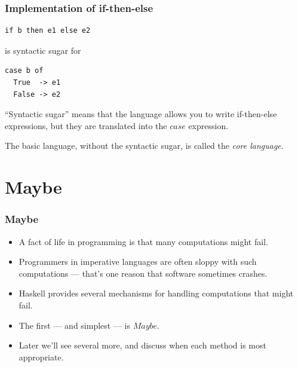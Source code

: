 \documentclass{beamer}
\begin{document}
\begin{frame}[fragile]
\frametitle{Implementation of if-then-else}

\begin{verbatim}
if b then e1 else e2
\end{verbatim}

is syntactic sugar for

\begin{verbatim}
case b of
  True  -> e1
  False -> e2
\end{verbatim}

``Syntactic sugar'' means that the language allows you to write
if-then-else expressions, but they are translated into the $case$
expression.

The basic language, without the syntactic sugar, is called the
\emph{core language}.

\end{frame}

\section{Maybe}

\begin{frame}[fragile]
\frametitle{Maybe}

\begin{itemize}
\item A fact of life in programming is that many computations might
  fail.
\item Programmers in imperative languages are often sloppy with
  such computations --- that's one reason that software sometimes
  crashes.
\item Haskell provides several mechanisms for handling computations
  that might fail.
\item The first --- and simplest --- is $Maybe$.
\item Later we'll see several more, and discuss when each method is
  most appropriate.
\end{itemize}

\end{frame}
\end{document}
